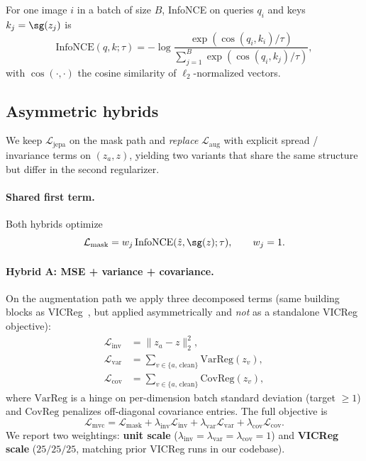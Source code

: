 For one image $i$ in a batch of size $B$, InfoNCE on queries $q_i$ and keys
$k_j = \sg(z_j)$ is
\begin{equation}
  \mathrm{InfoNCE}(q, k; \tau)
  = -\log \frac{\exp(\cos(q_i, k_i)/\tau)}
  {\sum_{j=1}^{B} \exp(\cos(q_i, k_j)/\tau)},
\end{equation}
with $\cos(\cdot,\cdot)$ the cosine similarity of $\ell_2$-normalized vectors.

\subsection{Asymmetric hybrids}
\label{sec:hybrid}

We keep $\mathcal{L}_{\mathrm{jepa}}$ on the mask path and \emph{replace}
$\mathcal{L}_{\mathrm{aug}}$ with explicit spread / invariance terms on
$(z_a, z)$, yielding two variants that share the same structure but differ in
the second regularizer.

\paragraph{Shared first term.}
Both hybrids optimize
\begin{equation}
  \mathcal{L}_{\mathrm{mask}}
  = w_j \,\mathrm{InfoNCE}(\hat{z}, \sg(z); \tau),
  \qquad w_j = 1.
\end{equation}

\paragraph{Hybrid A: MSE + variance + covariance.}
On the augmentation path we apply three decomposed terms (same building blocks
as VICReg~\cite{bardes2022vicreg}, but applied asymmetrically and \emph{not}
as a standalone VICReg objective):
\begin{align}
  \mathcal{L}_{\mathrm{inv}} &= \| z_a - z \|_2^2, \\
  \mathcal{L}_{\mathrm{var}} &= \sum_{v \in \{a,\,\mathrm{clean}\}}
    \mathrm{VarReg}(z_v), \\
  \mathcal{L}_{\mathrm{cov}} &= \sum_{v \in \{a,\,\mathrm{clean}\}}
    \mathrm{CovReg}(z_v),
\end{align}
where $\mathrm{VarReg}$ is a hinge on per-dimension batch standard deviation
(target $\ge 1$) and $\mathrm{CovReg}$ penalizes off-diagonal covariance
entries.
The full objective is
\begin{equation}
  \mathcal{L}_{\mathrm{mvc}}
  = \mathcal{L}_{\mathrm{mask}}
  + \lambda_{\mathrm{inv}} \mathcal{L}_{\mathrm{inv}}
  + \lambda_{\mathrm{var}} \mathcal{L}_{\mathrm{var}}
  + \lambda_{\mathrm{cov}} \mathcal{L}_{\mathrm{cov}}.
\end{equation}
We report two weightings: \textbf{unit scale}
($\lambda_{\mathrm{inv}} = \lambda_{\mathrm{var}} = \lambda_{\mathrm{cov}} = 1$)
and \textbf{VICReg scale}
($25/25/25$, matching prior VICReg runs in our codebase).

